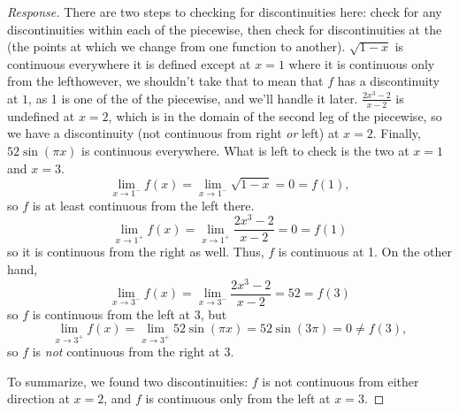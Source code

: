 \documentclass[english]{article}
\theoremstyle{remark}
\theoremstyle{definition}
\begin{document}
\begin{proof}[Response]
 There are two steps to checking for discontinuities here: check for any discontinuities within each  of the piecewise, then check for discontinuities at the  (the points at which we change from one function to another). $\sqrt{1-x}$ is continuous everywhere it is defined except at $x=1$ where it is continuous only from the left\textemdash however, we shouldn't take that to mean that $f$ has a discontinuity at $1$, as 1 is one of the  of the piecewise, and we'll handle it later. $\frac{2x^3-2}{x-2}$ is undefined at $x=2$, which is in the domain of the second leg of the piecewise, so we have a discontinuity (not continuous from right \textit{or} left) at $x=2$. Finally, $52\sin(\pi x)$ is continuous everywhere. What is left to check is the two  at $x=1$ and $x=3$. $$\lim_{x\to 1^-}f(x)=\lim_{x\to 1^-}\sqrt{1-x}=0=f(1),$$ so $f$ is at least continuous from the left there.  $$\lim_{x\to 1^+}f(x)=\lim_{x\to 1^+}\frac{2x^3-2}{x-2}=0=f(1)$$ so it is continuous from the right as well. Thus, $f$ is continuous at 1. On the other hand, $$\lim_{x\to 3^-}f(x)=\lim_{x\to 3^-}\frac{2x^3-2}{x-2}=52=f(3)$$ so $f$ is continuous from the left at 3, but $$\lim_{x\to 3^+}f(x)=\lim_{x\to 3^+}52\sin (\pi x)=52\sin (3\pi)=0\neq f(3),$$ so $f$ is \textit{not} continuous from the right at 3.
 
 To summarize, we found two discontinuities: $f$ is not continuous from either direction at $x=2$, and $f$ is continuous only from the left at $x=3$. 
\end{proof}	
\end{document}
